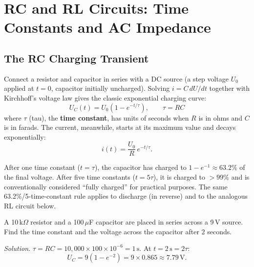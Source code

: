 \chapter{RC and RL Circuits: Time Constants and AC Impedance}
\label{ch:rc-rl}

\section{The RC Charging Transient}

Connect a resistor and capacitor in series with a DC source (a step
voltage $U_0$ applied at $t=0$, capacitor initially uncharged). Solving
$i = C\,dU/dt$ together with Kirchhoff's voltage law gives the classic
exponential charging curve:
\[
\boxed{U_C(t) = U_0\left(1 - e^{-t/\tau}\right)}, \qquad \tau = RC
\]
where $\tau$ (tau), the \textbf{time constant}, has units of seconds when
$R$ is in ohms and $C$ is in farads. The current, meanwhile, starts at
its maximum value and decays exponentially:
\[
i(t) = \frac{U_0}{R}\,e^{-t/\tau}.
\]

\begin{center}
\end{center}

\begin{keyidea}
After one time constant ($t=\tau$), the capacitor has charged to
$1-e^{-1} \approx 63.2\%$ of the final voltage. After five time constants
($t=5\tau$), it is charged to $>99\%$ and is conventionally considered
``fully charged'' for practical purposes. The same 63.2\%/5-time-constant
rule applies to discharge (in reverse) and to the analogous RL circuit
below.
\end{keyidea}

\begin{examplebox}
A 10\,k$\Omega$ resistor and a 100\,$\mu$F capacitor are placed in
series across a 9\,V source. Find the time constant and the voltage
across the capacitor after 2 seconds.

\emph{Solution.} $\tau = RC = 10{,}000 \times 100\times10^{-6} = 1\,\text{s}$.
At $t=2\,\text{s} = 2\tau$:
\[
U_C = 9\left(1-e^{-2}\right) = 9 \times 0.865 \approx 7.79\,\text{V}.
\]
\end{examplebox}

